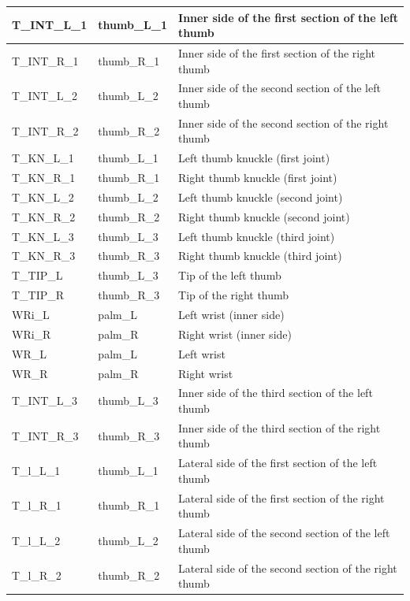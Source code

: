 \documentclass[../main.tex]{subfiles}
\begin{document}
\begin{longtable}{|p{2cm}|p{3cm}|p{5cm}|}
    T\_INT\_L\_1 & thumb\_L\_1 & Inner side of the first section of the left thumb \\ \hline
    T\_INT\_R\_1 & thumb\_R\_1 & Inner side of the first section of the right thumb \\ \hline
    T\_INT\_L\_2 & thumb\_L\_2 & Inner side of the second section of the left thumb \\ \hline
    T\_INT\_R\_2 & thumb\_R\_2 & Inner side of the second section of the right thumb \\ \hline
    T\_KN\_L\_1 & thumb\_L\_1 & Left thumb knuckle (first joint) \\ \hline
    T\_KN\_R\_1 & thumb\_R\_1 & Right thumb knuckle (first joint) \\ \hline
    T\_KN\_L\_2 & thumb\_L\_2 & Left thumb knuckle (second joint) \\ \hline
    T\_KN\_R\_2 & thumb\_R\_2 & Right thumb knuckle (second joint) \\ \hline
    T\_KN\_L\_3 & thumb\_L\_3 & Left thumb knuckle (third joint) \\ \hline
    T\_KN\_R\_3 & thumb\_R\_3 & Right thumb knuckle (third joint) \\ \hline
    T\_TIP\_L & thumb\_L\_3 & Tip of the left thumb \\ \hline
    T\_TIP\_R & thumb\_R\_3 & Tip of the right thumb \\ \hline
    WRi\_L & palm\_L & Left wrist (inner side) \\ \hline
    WRi\_R & palm\_R & Right wrist (inner side) \\ \hline
    WR\_L & palm\_L & Left wrist \\ \hline
    WR\_R & palm\_R & Right wrist \\ \hline
    T\_INT\_L\_3 & thumb\_L\_3 & Inner side of the third section of the left thumb \\ \hline
    T\_INT\_R\_3 & thumb\_R\_3 & Inner side of the third section of the right thumb \\ \hline
    T\_l\_L\_1 & thumb\_L\_1 & Lateral side of the first section of the left thumb \\ \hline
    T\_l\_R\_1 & thumb\_R\_1 & Lateral side of the first section of the right thumb \\ \hline
    T\_l\_L\_2 & thumb\_L\_2 & Lateral side of the second section of the left thumb \\ \hline
    T\_l\_R\_2 & thumb\_R\_2 & Lateral side of the second section of the right thumb \\ \hline

\end{longtable}
\end{document}
